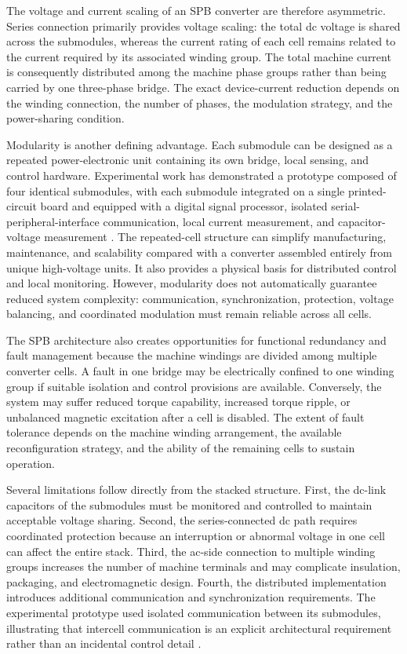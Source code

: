 The voltage and current scaling of an SPB converter are therefore asymmetric. Series connection primarily provides voltage scaling: the total dc voltage is shared across the submodules, whereas the current rating of each cell remains related to the current required by its associated winding group. The total machine current is consequently distributed among the machine phase groups rather than being carried by one three-phase bridge. The exact device-current reduction depends on the winding connection, the number of phases, the modulation strategy, and the power-sharing condition. %

Modularity is another defining advantage. Each submodule can be designed as a repeated power-electronic unit containing its own bridge, local sensing, and control hardware. Experimental work has demonstrated a prototype composed of four identical submodules, with each submodule integrated on a single printed-circuit board and equipped with a digital signal processor, isolated serial-peripheral-interface communication, local current measurement, and capacitor-voltage measurement \cite{Jin2017}. The repeated-cell structure can simplify manufacturing, maintenance, and scalability compared with a converter assembled entirely from unique high-voltage units. It also provides a physical basis for distributed control and local monitoring. However, modularity does not automatically guarantee reduced system complexity: communication, synchronization, protection, voltage balancing, and coordinated modulation must remain reliable across all cells.

The SPB architecture also creates opportunities for functional redundancy and fault management because the machine windings are divided among multiple converter cells. A fault in one bridge may be electrically confined to one winding group if suitable isolation and control provisions are available. Conversely, the system may suffer reduced torque capability, increased torque ripple, or unbalanced magnetic excitation after a cell is disabled. The extent of fault tolerance depends on the machine winding arrangement, the available reconfiguration strategy, and the ability of the remaining cells to sustain operation. %

Several limitations follow directly from the stacked structure. First, the dc-link capacitors of the submodules must be monitored and controlled to maintain acceptable voltage sharing. Second, the series-connected dc path requires coordinated protection because an interruption or abnormal voltage in one cell can affect the entire stack. Third, the ac-side connection to multiple winding groups increases the number of machine terminals and may complicate insulation, packaging, and electromagnetic design. Fourth, the distributed implementation introduces additional communication and synchronization requirements. The experimental prototype used isolated communication between its submodules, illustrating that intercell communication is an explicit architectural requirement rather than an incidental control detail \cite{Jin2017}.

